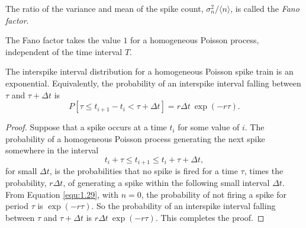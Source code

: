 \begin{defn}%
  The ratio of the variance and mean of the spike count,
  $\sigma^2_n/\langle n\rangle$, is called the \emph{Fano factor}. 
\end{defn}

\begin{exm}
  The Fano factor takes the value $1$ for a homogeneous Poisson process, independent of the time interval $T$.
\end{exm}

\begin{lem}
  The interspike interval distribution for a homogeneous Poisson spike train is an exponential. Equivalently, the probability of an interspike interval falling between $\tau$ and $\tau + \Delta t$ is 
  \begin{equation}
    P[\tau\leq t_{i+1}-t_{i}<\tau +\Delta t]=r\Delta t\ \exp(-r\tau).
    \label{equ:1.31}
  \end{equation}
  \begin{proof}
    Suppose that a spike occurs at a time $t_i$ for some value of $i$. The probability of a homogeneous Poisson process generating the next spike somewhere in the interval $$t_i+\tau \leq t_{i+1} \leq t_i + \tau +\Delta t,$$ for small $\Delta t$, is the probabilities that no spike is fired for a time $\tau$, times the probability, $r\Delta t$, of  generating a spike within the following small interval $\Delta t$. From Equation \ref{equ:1.29}, with $n=0$, the probability of not firing a spike for period $\tau$ is $\exp(-r\tau)$. So the probability of an interspike interval falling between $\tau$ and $\tau+\Delta t$ is $r\Delta t\ \exp(-r\tau)$. This completes the proof.
    \end{proof}\qedhere
\end{lem}

